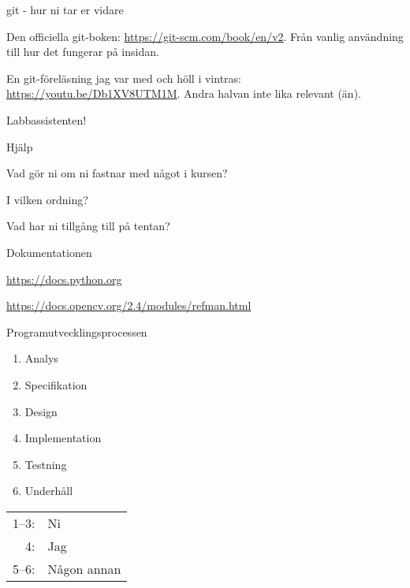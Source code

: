 \documentclass{beamer}
\begin{document}
  \begin{frame}{git - hur ni tar er vidare}

    Den officiella git-boken: \url{https://git-scm.com/book/en/v2}. Från vanlig
    användning till hur det fungerar på insidan.

    \pause{}

    En git-föreläsning jag var med och höll i vintras:
    \url{https://youtu.be/Db1XV8UTM1M}. Andra halvan inte lika relevant (än).

    \pause{}

    Labbassistenten!

  \end{frame}

  \begin{frame}{Hjälp}

    Vad gör ni om ni fastnar med något i kursen?

    I vilken ordning?

    \pause{}

    Vad har ni tillgång till på tentan?

  \end{frame}

  \begin{frame}{Dokumentationen}

    \url{https://docs.python.org}

    \url{https://docs.opencv.org/2.4/modules/refman.html}

  \end{frame}

  \begin{frame}{Programutvecklingsprocessen}

    \begin{enumerate}
      \item Analys
      \item Specifikation
      \item Design
      \item Implementation
      \item Testning
      \item Underhåll
    \end{enumerate}

    \pause{}

    \begin{tabular}{r l}
      1--3: & Ni \\
      4: & Jag \\
      5--6: & Någon annan
    \end{tabular}

  \end{frame}
\end{document}
